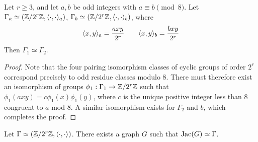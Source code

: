 \documentclass{amsart}
\begin{document}
\begin{lem}
 \label{lem:2group_pairing_iso}
 Let $r \ge 3$, and let $a,b$ be odd integers with $a \equiv b \pmod
 8$. Let $\Gamma_a \simeq (\mathbb{Z}/2^r\mathbb{Z}, \langle \cdot, \cdot \rangle_a)$,
 $\Gamma_b \simeq (\mathbb{Z}/2^r\mathbb{Z}, \langle \cdot, \cdot \rangle_b)$, where 
 \begin{equation*}
  \langle x, y \rangle_a = \frac{axy}{2^r} \qquad \langle x, y \rangle_b = \frac{bxy}{2^r}
 \end{equation*}
 Then $\Gamma_1 \simeq \Gamma_2$.
\end{lem}
\begin{proof}
  Note that the four pairing isomorphism classes of cyclic groups of
  order $2^r$ correspond precisely to odd residue classes modulo
  $8$. There must therefore exist an isomorphism of groups
  $\phi_1:\Gamma_1 \to \mathbb{Z}/2^r\mathbb{Z}$ such that $\phi_1(axy) =
  c\phi_1(x)\phi_1(y)$, where $c$ is the unique positive integer less
  than $8$ congruent to $a$ mod $8$. A similar isomorphism exists for
  $\Gamma_2$ and $b$, which completes the proof.
\end{proof}

\begin{thm} Let $\Gamma \simeq (\mathbb{Z}/2^r\mathbb{Z},
  \langle \cdot, \cdot \rangle)$. There exists a graph $G$ such that $\operatorname{Jac}(G)
  \simeq \Gamma$. 
\end{thm}
\end{document}
